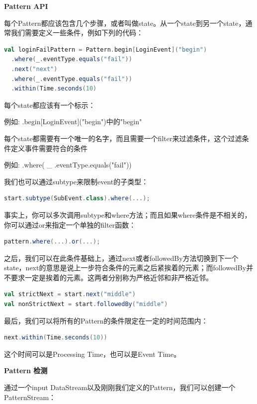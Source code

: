 \documentclass[oneside]{ctexbook}
\begin{document}
\textbf{Pattern API}

每个Pattern都应该包含几个步骤，或者叫做state。从一个state到另一个state，通常我们需要定义一些条件，例如下列的代码：

\begin{lstlisting}[language=scala]
val loginFailPattern = Pattern.begin[LoginEvent]("begin")
  .where(_.eventType.equals("fail"))
  .next("next")
  .where(_.eventType.equals("fail"))
  .within(Time.seconds(10)
\end{lstlisting}

每个state都应该有一个标示：

例如: .begin[LoginEvent]("begin")中的"begin"

每个state都需要有一个唯一的名字，而且需要一个filter来过滤条件，这个过滤条件定义事件需要符合的条件

例如: \colorbox{gray!20}{.where( \_ .eventType.equals("fail"))}

我们也可以通过subtype来限制event的子类型：

\begin{lstlisting}[language=scala]
start.subtype(SubEvent.class).where(...);
\end{lstlisting}

事实上，你可以多次调用subtype和where方法；而且如果where条件是不相关的，你可以通过or来指定一个单独的filter函数：

\begin{lstlisting}[language=scala]
pattern.where(...).or(...);
\end{lstlisting}

之后，我们可以在此条件基础上，通过next或者followedBy方法切换到下一个state，next的意思是说上一步符合条件的元素之后紧挨着的元素；而followedBy并不要求一定是挨着的元素。这两者分别称为严格近邻和非严格近邻。

\begin{lstlisting}[language=scala]
val strictNext = start.next("middle")
val nonStrictNext = start.followedBy("middle")
\end{lstlisting}

最后，我们可以将所有的Pattern的条件限定在一定的时间范围内：

\begin{lstlisting}[language=scala]
next.within(Time.seconds(10))
\end{lstlisting}

这个时间可以是Processing Time，也可以是Event Time。

\textbf{Pattern 检测}

通过一个input DataStream以及刚刚我们定义的Pattern，我们可以创建一个PatternStream：
\end{document}

